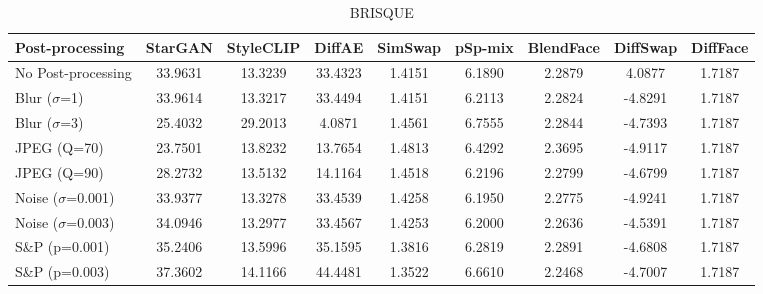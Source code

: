 \documentclass{article}
\begin{document}
\begin{table}[h!]
\begin{subtable}{\textwidth}
\caption{BRISQUE}
\centering
\scriptsize
\begin{tabular}{lcccccccc}
\toprule
\textbf{Post-processing} & StarGAN & StyleCLIP & DiffAE & SimSwap & pSp-mix & BlendFace & DiffSwap & DiffFace \\
\midrule
No Post-processing & 33.9631 & 13.3239 & 33.4323 & 1.4151 & 6.1890 & 2.2879 & 4.0877 & 1.7187 \\
\midrule
Blur ($\sigma$=1) & 33.9614 & 13.3217 & 33.4494 & 1.4151 & 6.2113 & 2.2824 & -4.8291 & 1.7187 \\
Blur ($\sigma$=3) & 25.4032 & 29.2013 & 4.0871 & 1.4561 & 6.7555 & 2.2844 & -4.7393 & 1.7187 \\
JPEG (Q=70) & 23.7501 & 13.8232 & 13.7654 & 1.4813 & 6.4292 & 2.3695 & -4.9117 & 1.7187 \\
JPEG (Q=90) & 28.2732 & 13.5132 & 14.1164 & 1.4518 & 6.2196 & 2.2799 & -4.6799 & 1.7187 \\
Noise ($\sigma$=0.001) & 33.9377 & 13.3278 & 33.4539 & 1.4258 & 6.1950 & 2.2775 & -4.9241 & 1.7187 \\
Noise ($\sigma$=0.003) & 34.0946 & 13.2977 & 33.4567 & 1.4253 & 6.2000 & 2.2636 & -4.5391 & 1.7187 \\
S\&P (p=0.001) & 35.2406 & 13.5996 & 35.1595 & 1.3816 & 6.2819 & 2.2891 & -4.6808 & 1.7187 \\
S\&P (p=0.003) & 37.3602 & 14.1166 & 44.4481 & 1.3522 & 6.6610 & 2.2468 & -4.7007 & 1.7187 \\
\bottomrule
\end{tabular}
\end{subtable}

\end{table}

\clearpage
\end{document}
